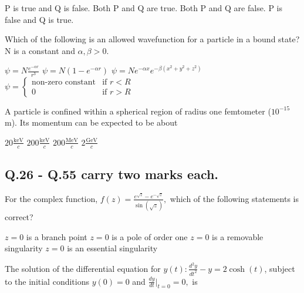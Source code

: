 \documentclass{exam}
\begin{document}
\begin{questions}
\begin{choices}
\begin{multicols}{2}
	\choice P is true and Q is false. \choice Both P and Q are true.
	\choice Both P and Q are false. \choice P is false and Q is true.
	\end{multicols}
\end{choices}

\question Which of the following is an allowed wavefunction for a particle in a bound state? N is a constant and $\alpha, \beta > 0$.\hfill{}

\begin{choices}
	\begin{multicols}{2}
	 \choice $\psi=N\frac{e^{-\alpha r}}{r^{3}}$
	\choice $\psi=N(1-e^{-\alpha r})$
	\choice $\psi=Ne^{-\alpha x}e^{-\beta(x^{2}+y^{2}+z^{2})}$
	\choice $\psi=\begin{cases} \text{non-zero constant} & \text{if } r<R \\ 0 & \text{if } r>R \end{cases}$
	\end{multicols}
\end{choices}

\question A particle is confined within a spherical region of radius one femtometer ($10^{-15}$m). Its momentum can be expected to be about\hfill{}

\begin{oneparchoices}
	\choice $20 \frac{\text{keV}}{c}$ \choice $200 \frac{\text{keV}}{c}$ \choice $200 \frac{\text{MeV}}{c}$ \choice $2 \frac{\text{GeV}}{c}$
\end{oneparchoices}

\subsection*{Q.26 - Q.55 carry two marks each.}

\question For the complex function, $f(z)=\frac{e^{\sqrt{z}}-e^{-\sqrt{z}}}{\sin(\sqrt{z})},$ which of the following statements is correct?\hfill{}

\begin{choices}
	\choice $z=0$ is a branch point \choice $z=0$ is a pole of order one
	\choice $z=0$ is a removable singularity \choice $z=0$ is an essential singularity
\end{choices}

\question The solution of the differential equation for $y(t): \frac{d^{2}y}{dt^{2}}-y=2\cosh(t)$, subject to the initial conditions $y(0)=0$ and $\frac{dy}{dt}|_{t=0}=0,$ is\hfill{}


\end{questions}
\end{document}
